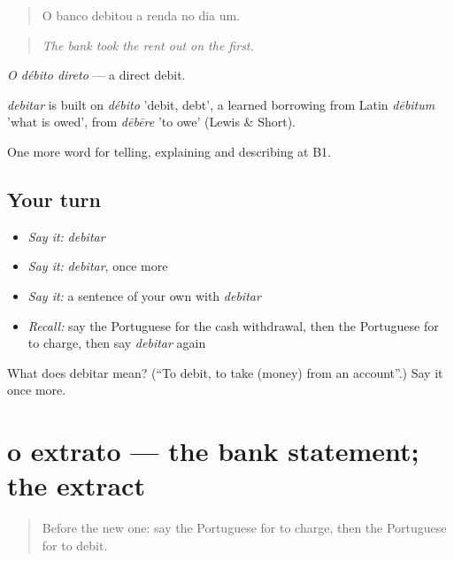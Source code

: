 \begin{quote}
O banco debitou a renda no dia um.
\end{quote}

\begin{quote}
\emph{The bank took the rent out on the first.}
\end{quote}

\emph{O débito direto} — a direct debit.

\begin{cousinweb}
\emph{debitar} is built on \emph{débito} 'debit, debt', a learned borrowing from Latin \emph{dēbitum} 'what is owed', from \emph{dēbēre} 'to owe' (Lewis \& Short).
\end{cousinweb}

\begin{grammarlens}[title={What you've built}]
One more word for telling, explaining and describing at B1.
\end{grammarlens}

\subsection*{Your turn}
\begin{itemize}
\raggedright
  \item \emph{Say it:} \emph{debitar}
  \item \emph{Say it:} \emph{debitar}, once more
  \item \emph{Say it:} a sentence of your own with \emph{debitar}
  \item \emph{Recall:} say the Portuguese for the cash withdrawal, then the Portuguese for to charge, then say \emph{debitar} again
\end{itemize}

\begin{tcolorbox}[breakable,colback=teal!4,colframe=teal!35!black,title={Before you move on}]
What does debitar mean? (\textquotedblleft{}To debit, to take (money) from an account\textquotedblright{}.) Say it once more.
\end{tcolorbox}
\section[o extrato]{o extrato — the bank statement; the extract}

\label{lesson:PT-C455-extrato}



\begin{quote}
Before the new one: say the Portuguese for to charge, then the Portuguese for to debit.
\end{quote}

